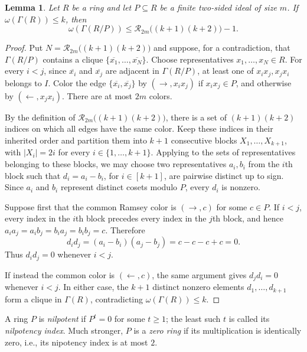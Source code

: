 \documentclass[a4paper,11pt]{amsart}
\newtheorem{lem}[lem]{Lemma}
\theoremstyle{definition}
\begin{document}
\begin{lem}\label{lem:finite-ideal-quotient}
Let $R$ be a ring and let $P\subseteq R$ be a finite two-sided ideal of size 
$m$. If $\omega(\Gamma(R))\le k$, then
\[
    \omega(\Gamma(R/P))
    \le
    \mathcal R_{2m}\bigl((k+1)(k+2)\bigr)-1.
\]

\end{lem}

\begin{proof}
Put $N=\mathcal R_{2m}\bigl((k+1)(k+2)\bigr)$ and suppose, for a contradiction,
that $\Gamma(R/P)$ contains a clique
$\{\overline{x_1},\ldots,\overline{x_N}\}$. Choose representatives
$x_1,\ldots,x_N\in R$. For every $i<j$, since $\overline{x_i}$ and $\overline{x_j}$ are
adjacent in $\Gamma(R/P)$, at least one of $x_ix_j,x_jx_i$ belongs to $I$.
Color the edge $\{\overline{x_i},\overline{x_j}\}$ by $(\to,x_ix_j)$ if $x_ix_j\in P$, and otherwise
by $(\leftarrow,x_jx_i)$. There are at most $2m$ colors.

By the definition of $\mathcal R_{2m}\bigl((k+1)(k+2)\bigr)$, there is a set
of $(k+1)(k+2)$ indices on which all edges have the same color. Keep these
indices in their inherited order and partition them into $k+1$ consecutive
blocks $X_1,\dots,X_{k+1}$, with $|X_i|=2i$ for every $i\in\{1,\dots,k+1\}$. Applying
 to the sets of representatives belonging to
these blocks, we may choose two representatives
$a_i,b_i$ from the $i$th block such that $d_i=a_i-b_i$, for $i\in[k+1]$, are pairwise distinct up
to sign. Since $a_i$ and $b_i$ represent distinct cosets modulo $P$, every
$d_i$ is nonzero.

Suppose first that the common Ramsey color is $(\to,c)$ for some $c\in P$.
If $i<j$, every index in the $i$th block precedes every index in the $j$th
block, and hence $a_ia_j=a_ib_j=b_ia_j=b_ib_j=c$. Therefore
\[
    d_id_j=(a_i-b_i)(a_j-b_j)=c-c-c+c=0.
\]
Thus $d_id_j=0$ whenever $i<j$.

If instead the common color is $(\leftarrow,c)$, the same argument gives
$d_jd_i=0$ whenever $i<j$. In either case, the $k+1$ distinct nonzero
elements $d_1,\ldots,d_{k+1}$ form a clique in $\Gamma(R)$, contradicting
$\omega(\Gamma(R))\le k$.
\end{proof}

A ring $P$ is \emph{nilpotent} if $P^t=0$ for some $t\ge1$; the least such
$t$ is called its \emph{nilpotency index}. Much stronger, $P$ is a \emph{zero ring}
if its multiplication is identically zero, i.e., its nipotency index is at most $2$.
\end{document}
